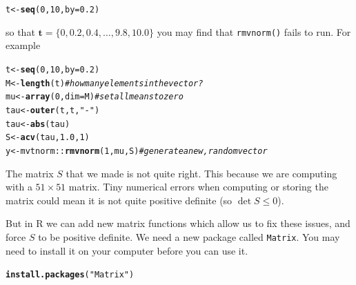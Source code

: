 \documentclass[a4paper,11pt]{article}\usepackage[]{graphicx}\usepackage[]{color}
\makeatletter
\newcommand{\hlnum}[1]{\textcolor[rgb]{0.686,0.059,0.569}{#1}}%
\newcommand{\hlstr}[1]{\textcolor[rgb]{0.192,0.494,0.8}{#1}}%
\newcommand{\hlcom}[1]{\textcolor[rgb]{0.678,0.584,0.686}{\textit{#1}}}%
\newcommand{\hlopt}[1]{\textcolor[rgb]{0,0,0}{#1}}%
\newcommand{\hlstd}[1]{\textcolor[rgb]{0.345,0.345,0.345}{#1}}%
\newcommand{\hlkwb}[1]{\textcolor[rgb]{0.69,0.353,0.396}{#1}}%
\newcommand{\hlkwc}[1]{\textcolor[rgb]{0.333,0.667,0.333}{#1}}%
\newcommand{\hlkwd}[1]{\textcolor[rgb]{0.737,0.353,0.396}{\textbf{#1}}}%
\newenvironment{kframe}{%
 \def\at@end@of@kframe{}%
 \ifinner\ifhmode%
  \def\at@end@of@kframe{\end{minipage}}%
  \begin{minipage}{\columnwidth}%
 \fi\fi%
 \def\FrameCommand##1{\hskip\@totalleftmargin \hskip-\fboxsep
 \colorbox{shadecolor}{##1}\hskip-\fboxsep
     \hskip-\linewidth \hskip-\@totalleftmargin \hskip\columnwidth}%
 \MakeFramed {\advance\hsize-\width
   \@totalleftmargin\z@ \linewidth\hsize
   \@setminipage}}%
 {\par\unskip\endMakeFramed%
 \at@end@of@kframe}
\newenvironment{knitrout}{}{} %
\makeatother
\begin{document}
\begin{knitrout}
\color{fgcolor}\begin{kframe}
\begin{alltt}
    \hlstd{t} \hlkwb{<-} \hlkwd{seq}\hlstd{(}\hlnum{0}\hlstd{,} \hlnum{10}\hlstd{,} \hlkwc{by} \hlstd{=} \hlnum{0.2}\hlstd{)}
\end{alltt}
\end{kframe}
\end{knitrout}

so that $\mathbf{t} = \{0, 0.2, 0.4, \ldots, 9.8, 10.0\}$ you may find that {\tt rmvnorm()} fails to run. For example

\begin{knitrout}
\color{fgcolor}\begin{kframe}
\begin{alltt}
  \hlstd{t} \hlkwb{<-} \hlkwd{seq}\hlstd{(}\hlnum{0}\hlstd{,}\hlnum{10}\hlstd{,}\hlkwc{by}\hlstd{=}\hlnum{0.2}\hlstd{)}
  \hlstd{M} \hlkwb{<-} \hlkwd{length}\hlstd{(t)}           \hlcom{# how many elements in the vector?}
  \hlstd{mu} \hlkwb{<-} \hlkwd{array}\hlstd{(}\hlnum{0}\hlstd{,} \hlkwc{dim}\hlstd{=M)}    \hlcom{# set all means to zero}
  \hlstd{tau} \hlkwb{<-} \hlkwd{outer}\hlstd{(t, t,} \hlstr{"-"}\hlstd{)}
  \hlstd{tau} \hlkwb{<-} \hlkwd{abs}\hlstd{(tau)}
  \hlstd{S} \hlkwb{<-} \hlkwd{acv}\hlstd{(tau,} \hlnum{1.0}\hlstd{,} \hlnum{1}\hlstd{)}
  \hlstd{y} \hlkwb{<-} \hlstd{mvtnorm}\hlopt{::}\hlkwd{rmvnorm}\hlstd{(}\hlnum{1}\hlstd{, mu, S)}   \hlcom{# generate a new, random vector}
\end{alltt}


{\ttfamily\noindent\color{warningcolor}{\#\# Warning in sqrt(ev\$values): NaNs produced}}\end{kframe}
\end{knitrout}

The matrix $S$ that we made is not quite right. This because we are computing with a $51 \times 51$ matrix. Tiny numerical errors when computing or storing the matrix could mean it is not quite positive definite (so $\det S \le 0$). 

But in R we can add new matrix functions which allow us to fix these issues, and force $S$ to be positive definite. We need a new package called {\tt Matrix}. You may need to install it on your computer before you can use it.

\begin{knitrout}
\color{fgcolor}\begin{kframe}
\begin{alltt}
  \hlkwd{install.packages}\hlstd{(}\hlstr{"Matrix"}\hlstd{)}
\end{alltt}
\end{kframe}
\end{knitrout}
\end{document}
